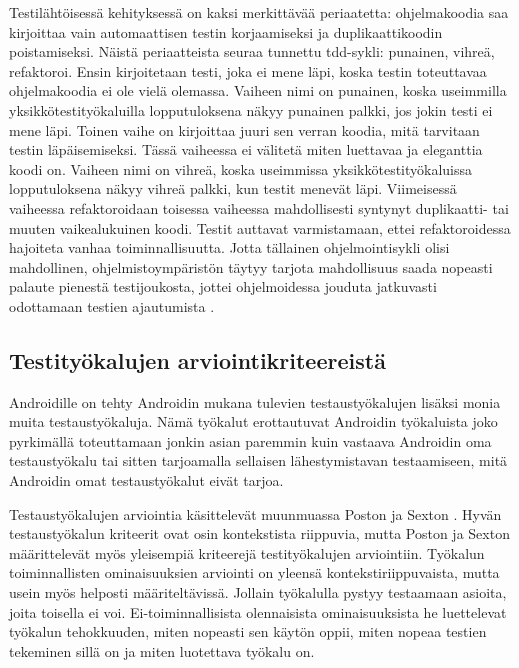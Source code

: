 Testilähtöisessä kehityksessä on kaksi merkittävää periaatetta: ohjelmakoodia saa kirjoittaa vain automaattisen testin korjaamiseksi ja duplikaattikoodin poistamiseksi. Näistä periaatteista seuraa tunnettu tdd-sykli: punainen, vihreä, refaktoroi. Ensin kirjoitetaan testi, joka ei mene läpi, koska testin toteuttavaa ohjelmakoodia ei ole vielä olemassa. Vaiheen nimi on punainen, koska useimmilla yksikkötestityökaluilla lopputuloksena näkyy punainen palkki, jos jokin testi ei mene läpi. Toinen vaihe on kirjoittaa juuri sen verran koodia, mitä tarvitaan testin läpäisemiseksi. Tässä vaiheessa ei välitetä miten luettavaa ja eleganttia koodi on. Vaiheen nimi on vihreä, koska useimmissa yksikkötestityökaluissa lopputuloksena näkyy vihreä palkki, kun testit menevät läpi. Viimeisessä vaiheessa refaktoroidaan toisessa vaiheessa mahdollisesti syntynyt duplikaatti- tai muuten vaikealukuinen koodi. Testit auttavat varmistamaan, ettei refaktoroidessa hajoiteta vanhaa toiminnallisuutta. Jotta tällainen ohjelmointisykli olisi mahdollinen, ohjelmistoympäristön täytyy tarjota mahdollisuus saada nopeasti palaute pienestä testijoukosta, jottei ohjelmoidessa jouduta jatkuvasti odottamaan testien ajautumista \cite{tdd}.

\subsection{Testityökalujen arviointikriteereistä}

Androidille on tehty Androidin mukana tulevien testaustyökalujen lisäksi monia muita testaustyökaluja. Nämä työkalut erottautuvat Androidin työkaluista joko pyrkimällä toteuttamaan jonkin asian paremmin kuin vastaava Androidin oma testaustyökalu tai sitten tarjoamalla sellaisen lähestymistavan testaamiseen, mitä Androidin omat testaustyökalut eivät tarjoa.

Testaustyökalujen arviointia käsittelevät muunmuassa Poston ja Sexton \cite{poston92}. Hyvän testaustyökalun kriteerit ovat osin kontekstista riippuvia, mutta Poston ja Sexton määrittelevät myös yleisempiä kriteerejä testityökalujen arviointiin. Työkalun toiminnallisten ominaisuuksien arviointi on yleensä kontekstiriippuvaista, mutta usein myös helposti määriteltävissä. Jollain työkalulla pystyy testaamaan asioita, joita toisella ei voi. Ei-toiminnallisista olennaisista ominaisuuksista he luettelevat työkalun tehokkuuden, miten nopeasti sen käytön oppii, miten nopeaa testien tekeminen sillä on ja miten luotettava työkalu on.

